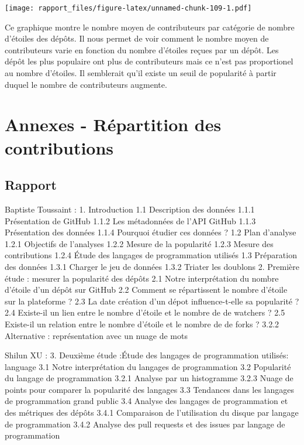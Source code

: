 \documentclass[
]{article}
\begin{document}
\texttt{[image: rapport\_files/figure-latex/unnamed-chunk-109-1.pdf]}

Ce graphique montre le nombre moyen de contributeurs par catégorie de
nombre d'étoiles des dépôts. Il nous permet de voir comment le nombre
moyen de contributeurs varie en fonction du nombre d'étoiles reçues par
un dépôt. Les dépôt les plus populaire ont plus de contributeurs mais ce
n'est pas proportionel au nombre d'étoiles. Il semblerait qu'il existe
un seuil de popularité à partir duquel le nombre de contributeurs
augmente.

\section{Annexes - Répartition des
contributions}\label{annexes---ruxe9partition-des-contributions}

\subsection{Rapport}\label{rapport}

Baptiste Toussaint : 1. Introduction 1.1 Description des données 1.1.1
Présentation de GitHub 1.1.2 Les métadonnées de l'API GitHub 1.1.3
Présentation des données 1.1.4 Pourquoi étudier ces données ? 1.2 Plan
d'analyse 1.2.1 Objectifs de l'analyses 1.2.2 Mesure de la popularité
1.2.3 Mesure des contributions 1.2.4 Étude des langages de programmation
utilisés 1.3 Préparation des données 1.3.1 Charger le jeu de données
1.3.2 Triater les doublons 2. Première étude : mesurer la popularité des
dépôts 2.1 Notre interprétation du nombre d'étoile d'un dépôt sur GitHub
2.2 Comment se répartissent le nombre d'étoile sur la plateforme ? 2.3
La date création d'un dépot influence-t-elle sa popularité ? 2.4
Existe-il un lien entre le nombre d'étoile et le nombre de de watchers ?
2.5 Existe-il un relation entre le nombre d'étoile et le nombre de de
forks ? 3.2.2 Alternative : représentation avec un nuage de mots

Shilun XU : 3. Deuxième étude :Étude des langages de programmation
utilisés: language 3.1 Notre interprétation du langages de programmation
3.2 Popularité du langage de programmation 3.2.1 Analyse par un
histogramme 3.2.3 Nuage de points pour comparer la popularité des
langages 3.3 Tendances dans les langages de programmation grand public
3.4 Analyse des langages de programmation et des métriques des dépôts
3.4.1 Comparaison de l'utilisation du disque par langage de
programmation 3.4.2 Analyse des pull requests et des issues par langage
de programmation
\end{document}
